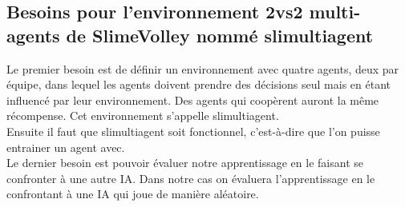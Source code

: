 \documentclass[11pt, a4paper]{article}
\begin{document}
	\subsection{Besoins pour l'environnement 2vs2 multi-agents de SlimeVolley nommé slimultiagent}
	Le premier besoin est de définir un environnement avec quatre agents, deux par équipe, dans lequel les agents doivent prendre des décisions seul mais en étant influencé par leur environnement. Des agents qui coopèrent auront la même récompense. Cet environnement s'appelle slimultiagent.\\
	Ensuite il faut que slimultiagent soit fonctionnel, c'est-à-dire que l'on puisse entrainer un agent avec. \\
	Le dernier besoin est pouvoir évaluer notre apprentissage en le faisant se confronter à une autre IA. Dans notre cas on évaluera  l'apprentissage en le confrontant à une IA qui joue de manière aléatoire.\\
\end{document}
